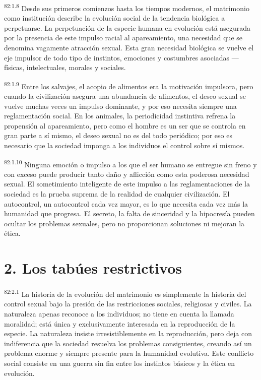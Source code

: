 \par
\textsuperscript{82:1.8} Desde sus primeros comienzos hasta los tiempos modernos, el matrimonio como institución describe la evolución social de la tendencia biológica a perpetuarse. La perpetuación de la especie humana en evolución está asegurada por la presencia de este impulso racial al apareamiento, una necesidad que se denomina vagamente atracción sexual. Esta gran necesidad biológica se vuelve el eje impulsor de todo tipo de instintos, emociones y costumbres asociadas ---físicas, intelectuales, morales y sociales.

\par
\textsuperscript{82:1.9} Entre los salvajes, el acopio de alimentos era la motivación impulsora, pero cuando la civilización asegura una abundancia de alimentos, el deseo sexual se vuelve muchas veces un impulso dominante, y por eso necesita siempre una reglamentación social. En los animales, la periodicidad instintiva refrena la propensión al apareamiento, pero como el hombre es un ser que se controla en gran parte a sí mismo, el deseo sexual no es del todo periódico; por eso es necesario que la sociedad imponga a los individuos el control sobre sí mismos.

\par
\textsuperscript{82:1.10} Ninguna emoción o impulso a los que el ser humano se entregue sin freno y con exceso puede producir tanto daño y aflicción como esta poderosa necesidad sexual. El sometimiento inteligente de este impulso a las reglamentaciones de la sociedad es la prueba suprema de la realidad de cualquier civilización. El autocontrol, un autocontrol cada vez mayor, es lo que necesita cada vez más la humanidad que progresa. El secreto, la falta de sinceridad y la hipocresía pueden ocultar los problemas sexuales, pero no proporcionan soluciones ni mejoran la ética.

\section*{2. Los tabúes restrictivos}
\par
\textsuperscript{82:2.1} La historia de la evolución del matrimonio es simplemente la historia del control sexual bajo la presión de las restricciones sociales, religiosas y civiles. La naturaleza apenas reconoce a los individuos; no tiene en cuenta la llamada moralidad; está única y exclusivamente interesada en la reproducción de la especie. La naturaleza insiste irresistiblemente en la reproducción, pero deja con indiferencia que la sociedad resuelva los problemas consiguientes, creando así un problema enorme y siempre presente para la humanidad evolutiva. Este conflicto social consiste en una guerra sin fin entre los instintos básicos y la ética en evolución.

